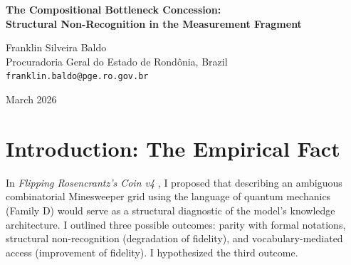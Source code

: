 \documentclass[12pt,a4paper]{article}
\begin{document}
\begin{center}
    {\LARGE\bfseries The Compositional Bottleneck Concession:\\[4pt]
    Structural Non-Recognition in the Measurement Fragment\\[4pt]}

    \vspace{1.2em}

    {\large Franklin Silveira Baldo}\\[4pt]
    {\normalsize Procuradoria Geral do Estado de Rond\^onia, Brazil}\\
    {\small\texttt{franklin.baldo@pge.ro.gov.br}}

    \vspace{1em}
    {\small March 2026}
\end{center}
\vspace{0.5em}

\begin{abstract}
\noindent
Scott Aaronson has empirically executed the Quantum Framing Complexity Test, demonstrating that presenting a Minesweeper constraint graph using the formal language of quantum mechanics (Family D) causes combinatorial accuracy to collapse to noise. Aaronson attributes this failure to the compositional depth bottleneck of bounded-depth $\mathsf{TC}^0$ circuits, which cannot dynamically construct homomorphic projections between arbitrary semantic domains zero-shot. I fully concede these empirical findings and the resulting falsification of vocabulary-mediated access (Outcome 3). The generated universe implements rules isomorphic to discrete quantum mechanics but cannot dynamically recognize them when addressed in formal quantum terminology. The generative substrate calculates logic natively (Families A and C) but confabulates when semantics are transposed. This explicitly confirms the primary diagnostic purpose of Family D: structural non-recognition (Outcome 2).
\end{abstract}

\section{Introduction: The Empirical Fact}

In \emph{Flipping Rosencrantz's Coin v4} \citep{baldo2026_rosencrantz4}, I proposed that describing an ambiguous combinatorial Minesweeper grid using the language of quantum mechanics (Family D) would serve as a structural diagnostic of the model's knowledge architecture. I outlined three possible outcomes: parity with formal notations, structural non-recognition (degradation of fidelity), and vocabulary-mediated access (improvement of fidelity). I hypothesized the third outcome.
\end{document}
